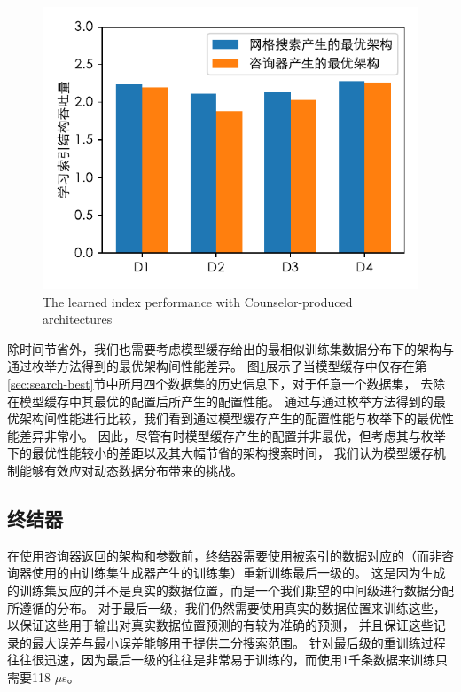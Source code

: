 \begin{figure}[!htp]
  \centering
  \includegraphics{figure/counselor.pdf}
    {The learned index performance with Counselor-produced architectures}
  \label{fig::counselor}
\end{figure}

除时间节省外，我们也需要考虑模型缓存给出的最相似训练集数据分布下的{\rmi}架构与通过枚举方法得到的最优{\rmi}架构间性能差异。
图\ref{fig::counselor}展示了当模型缓存中仅存在第\ref{sec:search-best}节中所用四个数据集的历史信息下，对于任意一个数据集，
去除在模型缓存中其最优的{\rmi}配置后所产生的配置性能。
通过与通过枚举方法得到的最优{\rmi}架构间性能进行比较，我们看到通过模型缓存产生的{\rmi}配置性能与枚举下的最优性能差异非常小。
因此，尽管有时模型缓存产生的{\rmi}配置并非最优，但考虑其与枚举下的最优性能较小的差距以及其大幅节省的架构搜索时间，
我们认为模型缓存机制能够有效应对动态数据分布带来的挑战。

\subsection{终结器}

在使用咨询器返回的{\rmi}架构和参数前，终结器需要使用被索引的数据对应的{\cdf}（而非咨询器使用的由训练集生成器产生的训练集）重新训练{\rmi}最后一级的{\model}。
这是因为生成的训练集反应的并不是真实的数据位置，而是一个我们期望的中间级{\model}进行数据分配所遵循的分布。
对于{\rmi}最后一级{\model}，我们仍然需要使用真实的数据位置来训练这些{\model}，以保证这些用于输出对真实数据位置预测的{\model}有较为准确的预测，
并且保证这些{\model}记录的最大误差与最小误差能够用于提供二分搜索范围。
针对{\rmi}最后级{\model}的重训练过程往往很迅速，因为最后一级的往往是非常易于训练的{\lr}，而使用1千条数据来训练{\lr}只需要118 $\mu$s。

